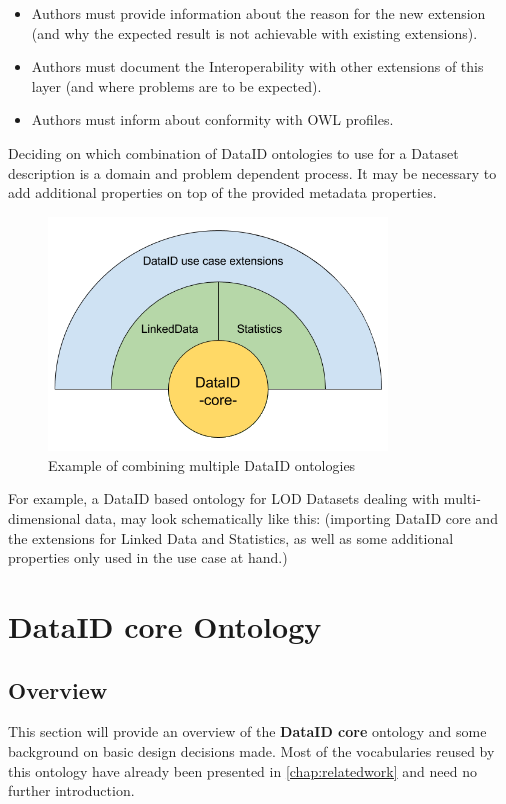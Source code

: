 \documentclass[a4paper,english,twoside,BCOR1.5cm,headsepline,DIV12,appendixprefix,final,12pt]{scrbook}
\newcommand{\core}{{\ttfamily\bfseries DataID core}\xspace}
\begin{document}
\begin{itemize}
\item Authors must provide information about the reason for the new extension (and why the expected result is not achievable with existing extensions).
\item Authors must document the Interoperability with other extensions of this layer (and where problems are to be expected).
\item Authors must inform about conformity with OWL profiles.
\end{itemize}

Deciding on which combination of DataID ontologies to use for a Dataset description is a domain and problem dependent process. It may be necessary to add additional properties on top of the provided metadata properties.

\begin{figure}[!htbp]
\centering
  \includegraphics[width=9cm]{images/DataIDonionSliced.png}
  \caption{Example of combining multiple DataID ontologies}
  \label{fig:onionslice}
\end{figure}

For example, a DataID based ontology for LOD Datasets dealing with multi-dimensional data, may look schematically like this:
(importing DataID core and the extensions for Linked Data and Statistics, as well as some additional properties only used in the use case at hand.)

\chapter{DataID core Ontology}
\label{cahp:core}

\section{Overview} 
\label{sec:coreintro}

This section will provide an overview of the \core ontology and some background on basic design decisions made. Most of the vocabularies reused by this ontology have already been presented in \cref{chap:relatedwork} and need no further introduction.
\end{document}
